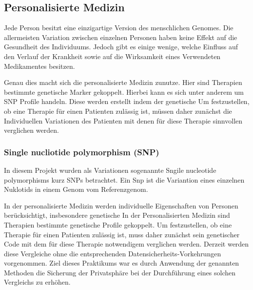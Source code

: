 \subsection{Personalisierte Medizin}

Jede Person besitzt eine einzigartige Version des menschlichen Genomes. Die allermeisten Variation zwischen einzelnen Personen haben keine Effekt auf die Gesundheit des Individuums. Jedoch gibt es einige wenige, welche Einfluss auf den Verlauf der Krankheit sowie auf die Wirksamkeit eines Verwendeten Medikamentes besitzen. 

Genau dies macht sich die personalisierte Medizin zunutze. 
Hier sind Therapien bestimmte genetische Marker gekoppelt.
Hierbei kann es sich unter anderem um SNP Profile handeln.
Diese werden erstellt indem der genetische 
Um festzustellen, ob eine Therapie für einen Patienten zulässig ist, müssen daher zunächst die Individuellen Variationen des Patienten mit denen für diese Therapie sinnvollen verglichen werden.

\subsubsection{ Single nucliotide polymorphism (SNP)}

In diesem Projekt wurden als Variationen sogenannte Sngile nucleotide polymorphisms kurz SNPs betrachtet. 
Ein Snp ist die Variantion eines einzelnen Nuklotids in einem Genom vom Referenzgenom. 

In der personalisierte Medizin werden individuelle Eigenschaften von Personen berücksichtigt, insbesondere genetische 
In der Personalisierten Medizin sind  Therapien bestimmte genetische Profile  gekoppelt.
Um festzustellen, ob eine Therapie für einen Patienten zulässig ist, muss daher zunächst sein genetischer Code mit dem für diese Therapie notwendigem verglichen werden.
Derzeit werden diese Vergleiche ohne die entsprechenden Datensicherheits-Vorkehrungen vorgenommen.
Ziel dieses Praktikums war es durch Anwendung der genannten Methoden die Sicherung der Privatsphäre bei der Durchführung eines solchen Vergleichs zu erhöhen.



